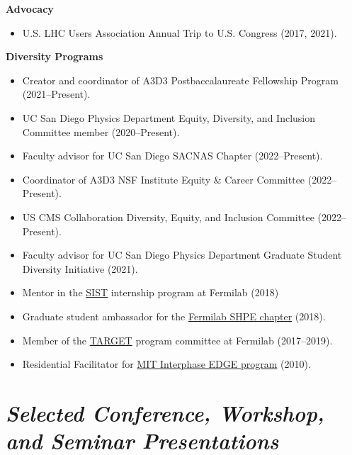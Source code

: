 \documentclass[11pt]{res}
\newcommand{\MarginText}[1]{\section{\textit{#1}}}
\begin{document}
\begin{resume}
  \textbf{Advocacy}
  \begin{itemize}
    \itemsep-0.3em
    \item U.S. LHC Users Association Annual Trip to U.S. Congress ({2017, 2021}).
  \end{itemize}

  \textbf{Diversity Programs}
  \begin{itemize}
    \itemsep-0.3em
    \item Creator and coordinator of A3D3 Postbaccalaureate Fellowship Program (2021--Present).
    \item UC San Diego Physics Department Equity, Diversity, and Inclusion Committee member ({2020--Present}).
    \item Faculty advisor for UC San Diego SACNAS Chapter ({2022--Present}).
    \item Coordinator of A3D3 NSF Institute Equity \& Career Committee ({2022--Present}).
    \item US CMS Collaboration Diversity, Equity, and Inclusion Committee ({2022--Present}).
    \item Faculty advisor for UC San Diego Physics Department Graduate Student Diversity Initiative ({2021}).
    \item Mentor in the \href{http://diversity.fnal.gov/sist/}{SIST} internship program at Fermilab ({2018})
    \item Graduate student ambassador for the \href{http://diversity.fnal.gov/fshpe/}{Fermilab SHPE chapter} ({2018}).
    \item Member of the \href{http://diversity.fnal.gov/target/}{TARGET} program committee at Fermilab ({2017--2019}).
    \item Residential Facilitator for \href{http://ome.mit.edu/programs-services/program-overview}{MIT Interphase EDGE program} ({2010}).
  \end{itemize}


  \MarginText{Selected Conference, Workshop, and Seminar Presentations}


\end{resume}
\end{document}
